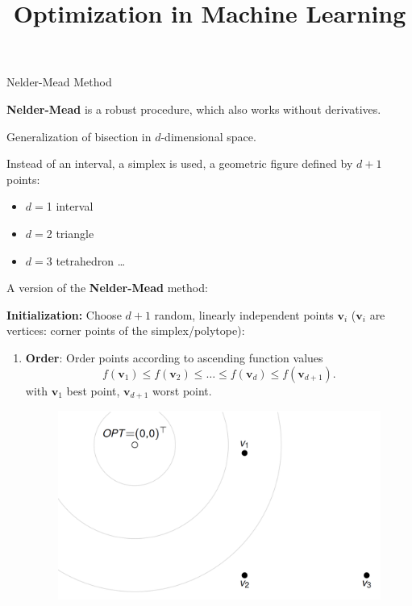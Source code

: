 \documentclass[11pt,compress,t,notes=noshow, xcolor=table]{beamer}
\title{Optimization in Machine Learning}
\date{}
\begin{document}
\sloppy



\begin{vbframe}{Nelder-Mead Method}

\textbf{Nelder-Mead} is a robust procedure, which also works without derivatives.

\lz

Generalization of bisection in $d$-dimensional space.

\lz

Instead of an interval, a simplex is used, a geometric figure defined by $d + 1$ points:

\begin{itemize}
\item $d = $1 interval
\item $d = $2 triangle
\item $d = $3 tetrahedron \dots
\end{itemize}

\framebreak

A version of the \textbf{Nelder-Mead} method:

\lz

\textbf{Initialization:} Choose $d + 1$ random, linearly independent points $\mathbf{v}_i$ ($\mathbf{v}_i$ are vertices: corner points of the simplex/polytope):

\begin{enumerate}
\item \textbf{Order}: Order points according to ascending function values
$$
f(\mathbf{v}_1) \leq f(\mathbf{v}_2) \leq \ldots \leq f(\mathbf{v}_d) \leq f(\mathbf{v}_{d + 1}).
$$
with $\mathbf{v}_1$ best point, $\mathbf{v}_{d + 1}$ worst point.

\begin{figure}
\includegraphics[width = 0.5\linewidth]{figure_man/Nelder01.png}
\end{figure}


\end{enumerate}
\end{vbframe}
\end{document}
